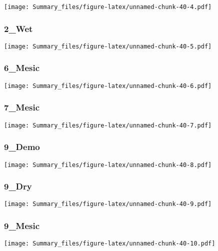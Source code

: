 \documentclass[
]{article}
\begin{document}
\texttt{[image: Summary\_files/figure-latex/unnamed-chunk-40-4.pdf]}

\hypertarget{wet-2}{%
\subsubsection{2\_Wet}\label{wet-2}}

\texttt{[image: Summary\_files/figure-latex/unnamed-chunk-40-5.pdf]}

\hypertarget{mesic-15}{%
\subsubsection{6\_Mesic}\label{mesic-15}}

\texttt{[image: Summary\_files/figure-latex/unnamed-chunk-40-6.pdf]}

\hypertarget{mesic-16}{%
\subsubsection{7\_Mesic}\label{mesic-16}}

\texttt{[image: Summary\_files/figure-latex/unnamed-chunk-40-7.pdf]}

\hypertarget{demo-2}{%
\subsubsection{9\_Demo}\label{demo-2}}

\texttt{[image: Summary\_files/figure-latex/unnamed-chunk-40-8.pdf]}

\hypertarget{dry-2}{%
\subsubsection{9\_Dry}\label{dry-2}}

\texttt{[image: Summary\_files/figure-latex/unnamed-chunk-40-9.pdf]}

\hypertarget{mesic-17}{%
\subsubsection{9\_Mesic}\label{mesic-17}}

\texttt{[image: Summary\_files/figure-latex/unnamed-chunk-40-10.pdf]}
\end{document}
